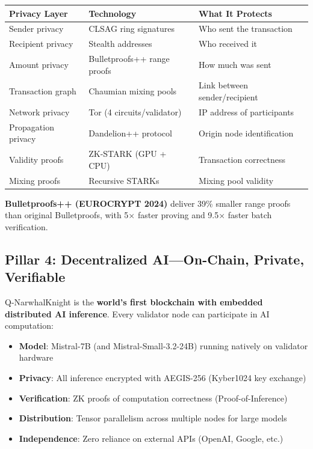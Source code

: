 \documentclass[11pt,a4paper]{article}
\begin{document}
\begin{center}
\begin{tabular}{@{}p{4cm}p{5cm}p{5cm}@{}}
\toprule
\textbf{Privacy Layer} & \textbf{Technology} & \textbf{What It Protects} \\
\midrule
Sender privacy & CLSAG ring signatures & Who sent the transaction \\
Recipient privacy & Stealth addresses & Who received it \\
Amount privacy & Bulletproofs++ range proofs & How much was sent \\
Transaction graph & Chaumian mixing pools & Link between sender/recipient \\
Network privacy & Tor (4 circuits/validator) & IP address of participants \\
Propagation privacy & Dandelion++ protocol & Origin node identification \\
Validity proofs & ZK-STARK (GPU + CPU) & Transaction correctness \\
Mixing proofs & Recursive STARKs & Mixing pool validity \\
\bottomrule
\end{tabular}
\end{center}

\textbf{Bulletproofs++ (EUROCRYPT 2024)} deliver 39\% smaller range proofs than original Bulletproofs, with 5$\times$ faster proving and 9.5$\times$ faster batch verification.

\subsection{Pillar 4: Decentralized AI---On-Chain, Private, Verifiable}

Q-NarwhalKnight is the \textbf{world's first blockchain with embedded distributed AI inference}. Every validator node can participate in AI computation:

\begin{itemize}[leftmargin=1.5em]
    \item \textbf{Model}: Mistral-7B (and Mistral-Small-3.2-24B) running natively on validator hardware
    \item \textbf{Privacy}: All inference encrypted with AEGIS-256 (Kyber1024 key exchange)
    \item \textbf{Verification}: ZK proofs of computation correctness (Proof-of-Inference)
    \item \textbf{Distribution}: Tensor parallelism across multiple nodes for large models
    \item \textbf{Independence}: Zero reliance on external APIs (OpenAI, Google, etc.)
\end{itemize}
\end{document}
